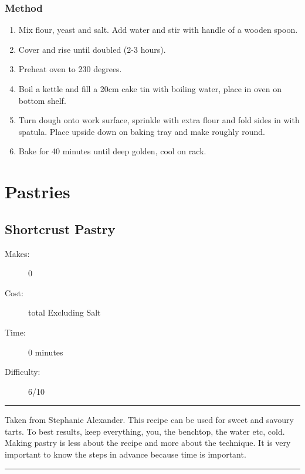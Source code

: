 \documentclass[]{article}
\begin{document}
\subsubsection*{\Large Method}
\begin{enumerate}[font=\huge\color{accent}]
	\item Mix flour, yeast and salt. Add water and stir with handle of a wooden spoon.
	\item Cover and rise until doubled (2-3 hours).
	\item Preheat oven to 230 degrees.
	\item Boil a kettle and fill a 20cm cake tin with boiling water, place in oven on bottom shelf.
	\item Turn dough onto work surface, sprinkle with extra flour and fold sides in with spatula. Place upside down on baking tray and make roughly round.
	\item Bake for 40 minutes until deep golden, cool on rack.
\end{enumerate}
\newpage
{}
\section*{\center\Huge\color{accent}Pastries}
\label{cat:Pastries}
\label{rec:Shortcrust Pastry}
\subsection*{\center\huge Shortcrust Pastry}
\begin{description}
\item[Makes:] 0 
\item[Cost:]  total Excluding Salt
\item[Time:] 0 minutes
\item[Difficulty:] 6/10
\end{description}
\vspace{0.2cm}\hrule\vspace{0.5cm}
\begin{adjustwidth}{0.5 cm}{0.5 cm}

Taken from Stephanie Alexander. This recipe can be used for sweet and savoury tarts. To best results, keep everything, you, the benchtop, the water etc, cold. Making pastry is less about the recipe and more about the technique. It is very important to know the steps in advance because time is important. \hfill\color{accent}{\Large\faVimeoSquare\hspace{0.1cm}\faTruck\hspace{0.1cm}}\color{black}

\end{adjustwidth}
\vspace{0.5cm}\hrule
\end{document}
